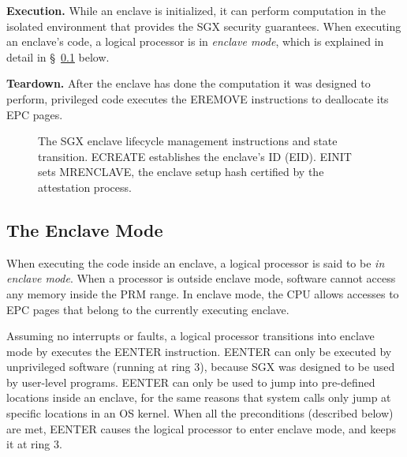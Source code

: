 \textbf{Execution.} While an enclave is initialized, it can perform computation
in the isolated environment that provides the SGX security guarantees. When
executing an enclave's code, a logical processor is in \textit{enclave mode},
which is explained in detail in \S~\ref{sec:enclave_mode} below.

\textbf{Teardown.} After the enclave has done the computation it was designed
to perform, privileged code executes the EREMOVE instructions to deallocate its
EPC pages.

\begin{figure}[hbt]
  \caption{
    The SGX enclave lifecycle management instructions and state transition.
    ECREATE establishes the enclave's ID (EID). EINIT sets MRENCLAVE, the
    enclave setup hash certified by the attestation process.
  }
  \label{fig:enclave_lifecycle}
\end{figure}


\subsection{The Enclave Mode}
\label{sec:enclave_mode}


When executing the code inside an enclave, a logical processor is said to be
\textit{in enclave mode}. When a processor is outside enclave mode, software
cannot access any memory inside the PRM range. In enclave mode, the CPU allows
accesses to EPC pages that belong to the currently executing enclave.

Assuming no interrupts or faults, a logical processor transitions into enclave
mode by executes the EENTER instruction. EENTER can only be executed by
unprivileged software (running at ring 3), because SGX was designed to be used
by user-level programs. EENTER can only be used to jump into pre-defined
locations inside an enclave, for the same reasons that system calls only jump
at specific locations in an OS kernel. When all the preconditions (described
below) are met, EENTER causes the logical processor to enter enclave mode, and
keeps it at ring 3.

